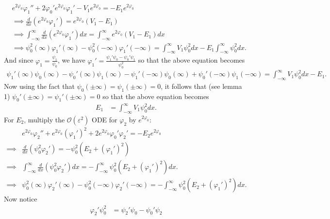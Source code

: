 \documentclass{article}
\begin{document}
\begin{itemize}
\begin{itemize}
        \begin{align*}
            &e^{2\varphi_0}\varphi_1'' + 2\varphi_0'e^{2\varphi_0}\varphi_1' - V_1e^{2\varphi_0} = -E_1e^{2\varphi_0}\\
            &\implies \frac{d}{dx}\left(e^{2\varphi_0}\varphi_1'\right) = e^{2\varphi_0}(V_1 - E_1)\\
            &\implies \int_{-\infty}^{\infty}\frac{d}{dx}\left(e^{2\varphi_0}\varphi_1'\right)dx = \int_{-\infty}^{\infty}e^{2\varphi_0}(V_1 - E_1)dx\\
            &\implies \psi_0^2(\infty)\varphi_1'(\infty) - \psi_0^2(-\infty)\varphi_1'(-\infty) = \int_{-\infty}^{\infty}V_1\psi_0^2dx - E_1\int_{-\infty}^{\infty}\psi_0^2dx.
        \end{align*}
        And since $\varphi_1 = \frac{\psi_1}{\psi_0}$, we have $\varphi_1' = \frac{\psi_1'\psi_0 - \psi_0'\psi_1}{\psi_0^2}$ so that the above equation becomes
        \begin{align*}
            \psi_1'(\infty)\psi_0(\infty) - \psi_0'(\infty)\psi_1(\infty) - \psi_1'(-\infty)\psi_0(\infty) + \psi_0'(-\infty)\psi_1(-\infty) = \int_{-\infty}^{\infty}V_1\psi_0^2dx - E_1.
        \end{align*}
        Now using the fact that $\psi_0(\pm \infty) = \psi_1(\pm \infty) = 0$, it follows that (see lemma 1) $\psi_0'(\pm \infty) = \psi_1'(\pm \infty) = 0$ so that the above equation becomes
        \begin{align*}
            E_1 &= \int_{-\infty}^{\infty}V_1\psi_0^2dx.
        \end{align*}
        For $E_2$, multiply the $\mathcal{O}(\varepsilon^2)$ ODE for $\varphi_2$ by $e^{2\varphi_0}$:
        \begin{align*}
            &e^{2\varphi_0}\varphi_2'' + e^{2\varphi_0}(\varphi_1')^2 + 2e^{2\varphi_0}\varphi_0'\varphi_2' = -E_2e^{2\varphi_0}\\
            \implies &\frac{d}{dx}\left(\psi_0^2\varphi_2'\right) = -\psi_0^2(E_2 + (\varphi_1')^2)\\
            \implies &\int_{-\infty}^{\infty}\frac{d}{dx}(\psi_0^2\varphi_2')dx = -\int_{-\infty}^{\infty}\psi_0^2(E_2 + (\varphi_1')^2)dx.\\
            \implies &\psi_0^2(\infty)\varphi_2'(\infty) - \psi_0^2(-\infty)\varphi_2'(-\infty) = -\int_{-\infty}^{\infty}\psi_0^2(E_2 + (\varphi_1')^2)dx.
         \end{align*}
         Now notice
         \begin{align*}
             \varphi_2'\psi_0^2 &= \psi_2'\psi_0 - \psi_0'\psi_2\\

\end{align*}
\end{itemize}
\end{itemize}
\end{document}
